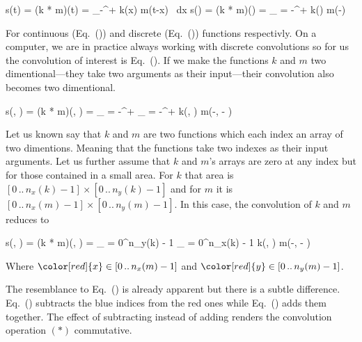 \startplaceformula[reference=cont-conv]
\startformula
s(t) = (k * m)(t) = \int_{{-}\infty}^{{+}\infty} k(x) \cdot m(t-x) \, {\rm d}x
\stopformula
\stopplaceformula
\startplaceformula[reference=disc-conv]
\startformula
s(\color[red]{x}) = (k * m)(\color[red]{x}) = \sum_{\color[blue]{x} = {-}\infty}^{{+}\infty} k(\color[blue]{x}) \cdot m(\color[red]{x}-\color[blue]{x})
\stopformula
\stopplaceformula

For continuous (Eq.~()) and discrete (Eq.~()) functions respectivly.
On a computer, we are in practice always working with discrete convolutions so for us the convolution of interest is Eq.~().
If we make the functions $k$ and $m$ two dimentional---they take two arguments as their input---their convolution also becomes two dimentional.

\startplaceformula[reference=twodim-disc-conv]
\startformula
s(\color[red]{x}, \color[red]{y}) = (k * m)(\color[red]{x}, \color[red]{y}) =
\sum_{\color[blue]{y} = {-}\infty}^{{+}\infty}
\sum_{\color[blue]{x} = {-}\infty}^{{+}\infty}
k(\color[blue]{x}, \color[blue]{y}) \cdot m(\color[red]{x}-\color[blue]{x}, \color[red]{y} - \color[blue]{y})
\stopformula
\stopplaceformula

\indentation
Let us known say that $k$ and $m$ are two functions which each index an array of two dimentions.
Meaning that the functions take two indexes as their input arguments.
Let us further assume that $k$ and $m$'s arrays are zero at any index but for those contained in a small area.
For $k$ that area is $[0 \, .. \, n_x(k) - 1] \times [0 \, .. \, n_y(k) - 1]$ and for $m$ it is $[0 \, .. \, n_x(m) - 1] \times [0 \, .. \, n_y(m) - 1]$.
In this case, the convolution of $k$ and $m$ reduces to

\startplaceformula[reference=twodim-disc-conv-finite]
\startformula
s(\color[red]{x}, \color[red]{y}) = (k * m)(\color[red]{x}, \color[red]{y}) = 
\sum_{\color[blue]{y} = 0}^{n_y(k) - 1} 
\sum_{\color[blue]{x} = 0}^{n_x(k) - 1} 
k(\color[blue]{x}, \color[blue]{y}) \cdot m(\color[red]{x}-\color[blue]{x}, \color[red]{y} - \color[blue]{y})
\stopformula
\stopplaceformula

Where $\color[red]{x} \in [0 \, .. \, n_x(m) - 1]$ and $\color[red]{y} \in [0 \, .. \, n_y(m) - 1]$.

The resemblance to Eq.~() is already apparent but there is a subtle difference.
Eq.~() subtracts the blue indices from the red ones while Eq.~() adds them together.
The effect of subtracting instead of adding renders the convolution operation $(*)$ commutative.

